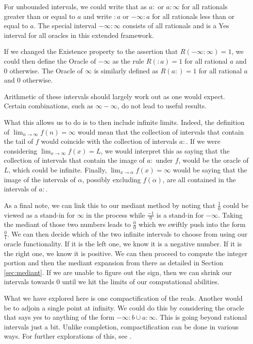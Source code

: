 \documentclass[12pt]{article}
\begin{document}
For unbounded intervals, we could write that as $a:$ or $a:\infty$ for all rationals greater than or equal to $a$ and write $:a$ or $-\infty:a$ for all rationals less than or equal to $a$. The special interval $-\infty:\infty$ consists of all rationals and is a Yes interval for all oracles in this extended framework. 

If we changed the Existence property to the assertion that $R(-\infty:\infty)=1$, we could then define the Oracle of $-\infty$ as the rule $R(:a) = 1$ for all rational $a$ and 0 otherwise. The Oracle of $\infty$ is similarly defined as $R(a:)=1$  for all rational $a$ and 0 otherwise. 

Arithmetic of these intervals should largely work out as one would expect. Certain combinations, such as $\infty-\infty$, do not lead to useful results. 

What this allows us to do is to then include infinite limits. Indeed, the definition of $\lim_{n\to \infty} f(n) = \infty$ would mean that the collection of intervals that contain the tail of $f$ would coincide with the collection of intervals $a:$. If we were considering $\lim_{x \to \infty} f(x) = L$, we would interpret this as saying that the collection of intervals that contain the image of $a:$ under $f$, would be the oracle of $L$, which could be infinite.  Finally, $\lim_{x \to \alpha} f(x) = \infty$ would be saying that the image of the intervals of $\alpha$, possibly excluding $f(\alpha)$, are all contained in the intervals of $a:$. 

As a final note, we can link this to our mediant method by noting that $\frac{1}{0}$ could be viewed as a stand-in for $\infty$ in the process while $\frac{-1}{0}$ is a stand-in for $-\infty$. Taking the mediant of those two numbers leads to $\frac{0}{0}$ which we swiftly push into the form $\frac{0}{1}$. We can then decide which of the two infinite intervals to choose from using our oracle functionality. If it is the left one, we know it is a negative number. If it is the right one, we know it is positive. We can then proceed to compute the integer portion and then the mediant expansion from there as detailed in Section \ref{sec:mediant}. If we are unable to figure out the sign, then we can shrink our intervals towards $0$ until we hit the limits of our computational abilities. 

What we have explored here is one compactification of the reals. Another would be to adjoin a single point at infinity. We could do this by considering the oracle that says yes to anything of the form $-\infty:b \cup a:\infty$. This is going beyond rational intervals just a bit. Unlike completion, compactification can be done in various ways. For further explorations of this, see \cite{taylor23metric}. 
\end{document}
